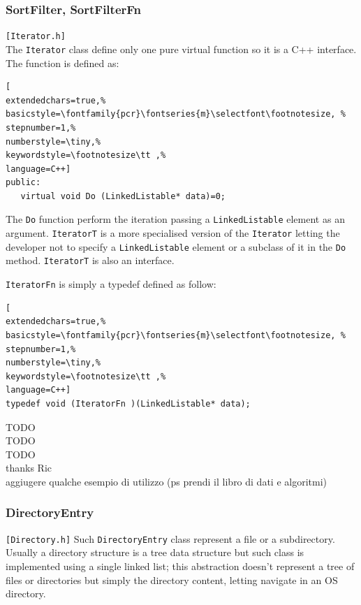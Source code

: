 \subsubsection{SortFilter, SortFilterFn}
\texttt{[Iterator.h]}\\
The \texttt{Iterator} class define only one pure virtual function so it is a C++ interface. The function is defined as:

\begin{lstlisting}[
extendedchars=true,%
basicstyle=\fontfamily{pcr}\fontseries{m}\selectfont\footnotesize, %
stepnumber=1,%
numberstyle=\tiny,%
keywordstyle=\footnotesize\tt ,%
language=C++]
public:
   virtual void Do (LinkedListable* data)=0;
\end{lstlisting}

The \texttt{Do} function perform the iteration passing a \texttt{LinkedListable} element as an argument. 
\texttt{IteratorT} is a more specialised version of the \texttt{Iterator} letting the developer not to specify a \texttt{LinkedListable} element or a subclass of it in the \texttt{Do} method. \texttt{IteratorT} is also an interface.

\texttt{IteratorFn} is simply a typedef defined as follow:

\begin{lstlisting}[
extendedchars=true,%
basicstyle=\fontfamily{pcr}\fontseries{m}\selectfont\footnotesize, %
stepnumber=1,%
numberstyle=\tiny,%
keywordstyle=\footnotesize\tt ,%
language=C++]
typedef void (IteratorFn )(LinkedListable* data);
\end{lstlisting}

TODO \\
TODO \\
TODO \\
thanks Ric \\
aggiugere qualche esempio di utilizzo (ps prendi il libro di dati e algoritmi)


\subsubsection{DirectoryEntry}
\texttt{[Directory.h]}
Such \texttt{DirectoryEntry} class represent a file or a subdirectory. Usually a directory structure is a tree data structure but such class is implemented using a single linked list; this abstraction doesn't represent a tree of files or directories but simply the directory content, letting navigate in an OS directory.\\


